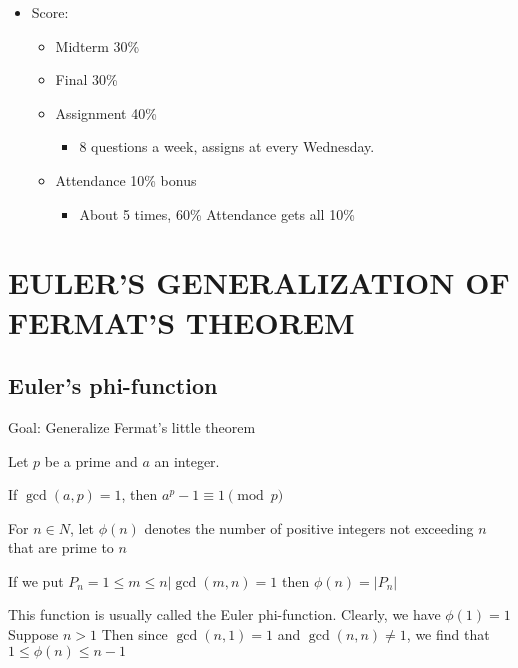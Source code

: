 

\begin{itemize}
    \item Score:
    \begin{itemize}
        \item Midterm 30\%
        \item Final 30\%
        \item Assignment 40\%
        \begin{itemize}
            \item 8 questions a week, assigns at every Wednesday.
        \end{itemize}
        \item Attendance 10\% bonus
        \begin{itemize}
            \item About 5 times, 60\% Attendance gets all 10\%
        \end{itemize}
    \end{itemize}
\end{itemize}


\setcounter{chapter}{6}
\chapter{EULER'S GENERALIZATION OF FERMAT'S THEOREM}

\setcounter{section}{1}
\section{Euler's phi-function}
Goal: Generalize Fermat's little theorem

\begin{theorem}
    Let $p$ be a prime and $a$ an integer.

    If $\gcd(a, p) = 1$, then $a^p-1 \equiv 1 \pmod p$
\end{theorem}

\begin{definition}{}
    For $n \in N$, 
    let $\phi(n)$ denotes the number of positive integers not exceeding $n$ that are prime to $n$
\end{definition}
\begin{eg}
    If we put $P_n={1 \leq m \leq n | \gcd(m, n) = 1}$ then $\phi(n) = |P_n|$
\end{eg}

\begin{remark}
    This function is usually called the Euler phi-function.
    Clearly, we have $\phi(1) = 1$
    Suppose $n > 1$ Then since $\gcd(n, 1) = 1$ and $\gcd(n, n) \neq 1$, we find that $1 \leq \phi(n) \leq n-1$
\end{remark}

